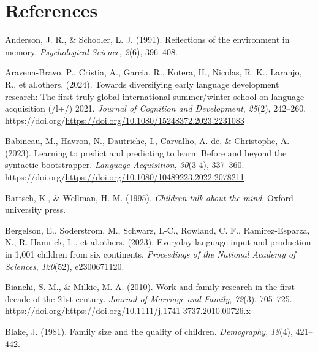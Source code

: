 \documentclass[
  man,floatsintext]{apa6}
\newlength{\cslhangindent}
\newenvironment{CSLReferences}[2] %
 {\begin{list}{}{%
  \setlength{\itemindent}{0pt}
  \setlength{\leftmargin}{0pt}
  \setlength{\parsep}{0pt}
  \ifodd #1
   \setlength{\leftmargin}{\cslhangindent}
   \setlength{\itemindent}{-1\cslhangindent}
  \fi
  \setlength{\itemsep}{#2\baselineskip}}}
 {\end{list}}
\begin{document}
\newpage

\section*{References}\label{references}

\label{refs}
\begin{CSLReferences}{1}{0}
Anderson, J. R., \& Schooler, L. J. (1991). Reflections of the environment in memory. \emph{Psychological Science}, \emph{2}(6), 396--408.

Aravena-Bravo, P., Cristia, A., Garcia, R., Kotera, H., Nicolas, R. K., Laranjo, R., et al.others. (2024). Towards diversifying early language development research: The first truly global international summer/winter school on language acquisition (/l+/) 2021. \emph{Journal of Cognition and Development}, \emph{25}(2), 242--260. https://doi.org/\url{https://doi.org/10.1080/15248372.2023.2231083}

Babineau, M., Havron, N., Dautriche, I., Carvalho, A. de, \& Christophe, A. (2023). Learning to predict and predicting to learn: Before and beyond the syntactic bootstrapper. \emph{Language Acquisition}, \emph{30}(3-4), 337--360. https://doi.org/\url{https://doi.org/10.1080/10489223.2022.2078211}

Bartsch, K., \& Wellman, H. M. (1995). \emph{Children talk about the mind}. Oxford university press.

Bergelson, E., Soderstrom, M., Schwarz, I.-C., Rowland, C. F., Ramirez-Esparza, N., R. Hamrick, L., et al.others. (2023). Everyday language input and production in 1,001 children from six continents. \emph{Proceedings of the National Academy of Sciences}, \emph{120}(52), e2300671120.

Bianchi, S. M., \& Milkie, M. A. (2010). Work and family research in the first decade of the 21st century. \emph{Journal of Marriage and Family}, \emph{72}(3), 705--725. https://doi.org/\url{https://doi.org/10.1111/j.1741-3737.2010.00726.x}

Blake, J. (1981). Family size and the quality of children. \emph{Demography}, \emph{18}(4), 421--442.


\end{CSLReferences}
\end{document}
